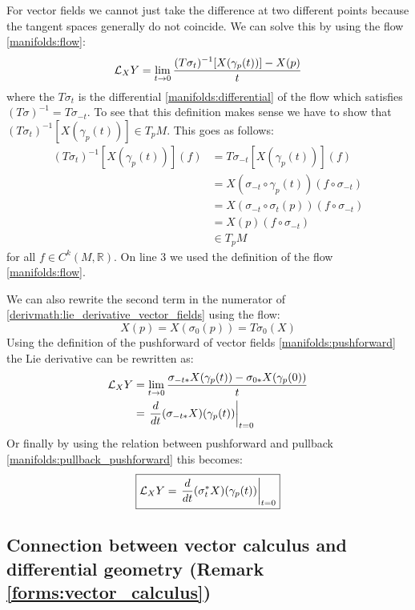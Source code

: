	For vector fields we cannot just take the difference at two different points because the tangent spaces generally do not coincide. We can solve this by using the flow \ref{manifolds:flow}:
	\begin{equation}
		\label{derivmath:lie_derivative_vector_fields}
		\mathcal{L}_XY = \lim_{t\rightarrow0}\stylefrac{(T\sigma_t)^{-1}[X(\gamma_p(t))] - X(p)}{t}
	\end{equation}
	where the $T\sigma_t$ is the differential \ref{manifolds:differential} of the flow which satisfies $(T\sigma)^{-1} = T\sigma_{-t}$. To see that this definition makes sense we have to show that $(T\sigma_t)^{-1}[X(\gamma_p(t))]\in T_pM$. This goes as follows:
	\begin{align*}
		(T\sigma_t)^{-1}[X(\gamma_p(t))](f) &= T\sigma_{-t}[X(\gamma_p(t))](f)\\
		&= X(\sigma_{-t}\circ\gamma_p(t))(f\circ\sigma_{-t})\\
		&= X(\sigma_{-t}\circ\sigma_t(p))(f\circ\sigma_{-t})\\
		&= X(p)(f\circ\sigma_{-t})\\
		&\in T_pM
	\end{align*}
	for all $f\in C^k(M, \mathbb{R})$. On line 3 we used the definition of the flow \ref{manifolds:flow}.
		
	We can also rewrite the second term in the numerator of \ref{derivmath:lie_derivative_vector_fields} using the flow:
	\[
		X(p) = X(\sigma_0(p)) = T\sigma_0(X)
	\]
	Using the definition of the pushforward of vector fields \ref{manifolds:pushforward} the Lie derivative can be rewritten as:
	\begin{align*}
		\mathcal{L}_XY &= \lim_{t\rightarrow0}\stylefrac{\sigma_{-t*}X(\gamma_p(t)) - \sigma_{0*}X(\gamma_p(0))}{t}\\
		&= \left.\deriv{}{t}(\sigma_{-t*}X)(\gamma_p(t))\right|_{t=0}
	\end{align*}
	Or finally by using the relation between pushforward and pullback \ref{manifolds:pullback_pushforward} this becomes:
	\begin{equation}
		\boxed{\mathcal{L}_XY = \left.\frac{d}{dt}(\sigma_t^*X)(\gamma_p(t))\right|_{t=0}}
	\end{equation}
		 
\subsection{Connection between vector calculus and differential geometry (Remark \ref{forms:vector_calculus})}

